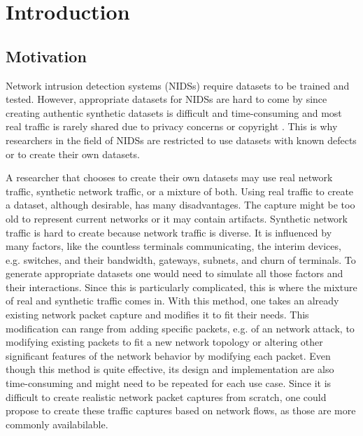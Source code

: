 \documentclass[
	ngerman,
	ruledheaders=section,%
	class=report,%
	thesis={type=bachelor},%
	accentcolor=9c,%
	custommargins=true,%
	marginpar=false,%
	parskip=half-,%
	fontsize=11pt,%
]{tudapub}
\begin{document}

\chapter{Introduction}
\label{sec:intro}

\section{Motivation}
\label{sec:motivation}

Network intrusion detection systems (NIDSs) require datasets to be trained and tested.
However, appropriate datasets for NIDSs are hard to come by
since creating authentic synthetic datasets is difficult and time-consuming
and most real traffic is rarely shared due to privacy concerns \cite{ringFlowbasedNetworkTraffic2019a} or copyright \cite{corderoID2TDIYDataset2015}.
This is why researchers in the field of NIDSs are restricted to use datasets with known defects or to create their own datasets.

A researcher that chooses to create their own datasets may use real network traffic, synthetic network traffic, or a mixture of both.
Using real traffic to create a dataset, although desirable, has many disadvantages.
The capture might be too old to represent current networks or
it may contain artifacts.
Synthetic network traffic is hard to create because network traffic is diverse.
It is influenced by many factors, like
the countless terminals communicating,
the interim devices, e.g. switches, and their bandwidth,
gateways, subnets, and churn of terminals.
To generate appropriate datasets one would need to simulate all those factors and their interactions.
Since this is particularly complicated,
this is where the mixture of real and synthetic traffic comes in.
With this method, one takes an already existing network packet capture and modifies it to fit their needs.
This modification can range from adding specific packets, e.g. of an network attack\cite{corderoID2TDIYDataset2015},
to modifying existing packets to fit a new network topology
or altering other significant features of the network behavior by modifying each packet.
Even though this method is quite effective, its design and implementation are also time-consuming and might need to be repeated for each use case.
Since it is difficult to create realistic network packet captures from scratch,
one could propose to create these traffic captures based on network flows, as those are more commonly availabilable.
\end{document}

